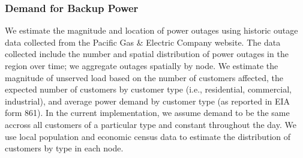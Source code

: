 \documentclass[conference]{IEEEtran}
\begin{document}
\subsubsection{Demand for Backup Power}
We estimate the magnitude and location of power outages using historic outage data collected from the Pacific Gas \& Electric Company website. The data collected include the number and spatial distribution of power outages in the region over time; we aggregate outages spatially by node. We estimate the magnitude of unserved load based on the number of customers affected, the expected number of customers by customer type (i.e., residential, commercial, industrial), and average power demand by customer type (as reported in EIA form 861). In the current implementation, we assume demand to be the same accross all customers of a particular type and constant throughout the day. We use local population and economic census data to estimate the distribution of customers by type in each node.
\end{document}
